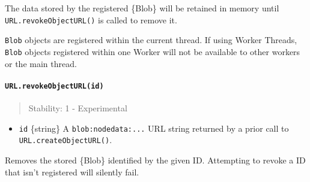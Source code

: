 \begin{Shaded}
\begin{Highlighting}[]
\NormalTok{ \{}
  \OperatorTok{,}
\OperatorTok{,}
\NormalTok{\} }\OperatorTok{=} \NormalTok{(}\NormalTok{)}\OperatorTok{;}

\OperatorTok{=}  \NormalTok{([}\NormalTok{])}\OperatorTok{;}
\OperatorTok{=}\OperatorTok{;}


\OperatorTok{=} \OperatorTok{;}
\NormalTok{)}\OperatorTok{;}
\end{Highlighting}
\end{Shaded}

The data stored by the registered \{Blob\} will be retained in memory
until \texttt{URL.revokeObjectURL()} is called to remove it.

\texttt{Blob} objects are registered within the current thread. If using
Worker Threads, \texttt{Blob} objects registered within one Worker will
not be available to other workers or the main thread.

\paragraph{\texorpdfstring{\texttt{URL.revokeObjectURL(id)}}{URL.revokeObjectURL(id)}}\label{url.revokeobjecturlid}

\begin{quote}
Stability: 1 - Experimental
\end{quote}

\begin{itemize}
\tightlist
\item
  \texttt{id} \{string\} A \texttt{\textquotesingle{}blob:nodedata:...}
  URL string returned by a prior call to \texttt{URL.createObjectURL()}.
\end{itemize}

Removes the stored \{Blob\} identified by the given ID. Attempting to
revoke a ID that isn't registered will silently fail.


